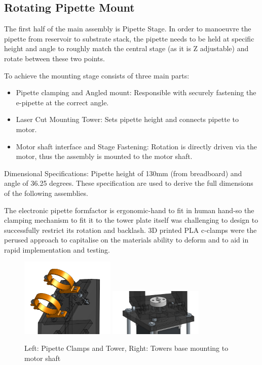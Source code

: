 \subsection{Rotating Pipette Mount}

The first half of the main assembly is Pipette Stage. In order to manoeuvre the pipette from reservoir to substrate stack, the pipette needs to be held at specific height and angle to roughly match the central stage (as it is Z adjustable) and rotate between these two points.

To achieve the mounting stage consists of three main parts: 
\begin{itemize}
    \item Pipette clamping and Angled mount: Responsible with securely fastening the e-pipette at the correct angle.
    \item Laser Cut Mounting Tower: Sets pipette height and connects pipette to motor.
    \item Motor shaft interface and Stage Fastening: Rotation is directly driven via the motor, thus the assembly is mounted to the motor shaft. 
\end{itemize}

Dimensional Specifications: Pipette height of 130mm (from breadboard) and angle of 36.25 degrees.
These specification are used to derive the full dimensions of the following assemblies.

The electronic pipette formfactor is ergonomic-hand to fit in human hand-so the clamping mechanism to fit it to the tower plate itself was challenging to design to successfully restrict its rotation and backlash. 3D printed PLA c-clamps were the perused approach to capitalise on the materials ability to deform and to aid in rapid implementation and testing.

\begin{figure}[h]
    \centering
    \includegraphics[width=0.4\textwidth]{img/pip_clamp.png}
    \includegraphics[width=0.4\textwidth]{img/tower_mount.png}
    \caption{Left: Pipette Clamps and Tower, Right: Towers base mounting to motor shaft}
    \label{fig:tower}
\end{figure}

